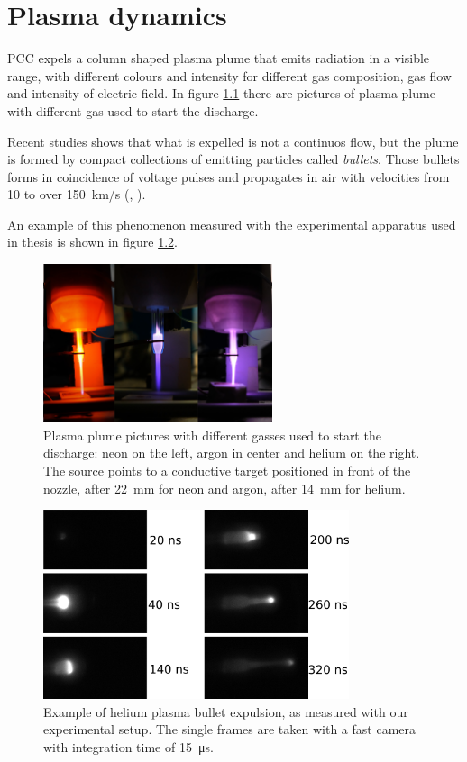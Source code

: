 \chapter{Plasma dynamics}
\label{ch:shape}
PCC expels a column shaped plasma plume that emits radiation in a visible range, with different colours and intensity for different gas composition, gas flow and intensity of electric field. In figure \ref{fig:pl_picture} there are pictures of plasma plume with different gas used to start the discharge.

Recent studies shows that what is expelled is not a continuos flow, but the plume is formed by compact collections of emitting particles called \emph{bullets}. Those bullets forms in coincidence of voltage pulses and propagates in air with velocities from \num{10} to over \SI{150}{\kilo\meter/\second} (\cite{Mericam_Bourdet_2009}, \cite{doi:10.1002/ppap.200900078}).

An example of this phenomenon measured with the experimental apparatus used in thesis is shown in figure \ref{fig:pl_bullet}.
\begin{figure}
 \centering
 \includegraphics[width = 0.6\textwidth]{Images/Shape/plasmapic.png}
 \caption{Plasma plume pictures with different gasses used to start the discharge: neon on the left, argon in center and helium on the right. The source points to a conductive target positioned in front of the nozzle, after \SI{22}{\milli\meter} for neon and argon, after \SI{14}{\milli\meter} for helium.}
 \label{fig:pl_picture}
\end{figure}
\begin{figure}
 \centering
 \includegraphics[width=0.8\textwidth]{Images/Shape/frames.png}
 \caption{Example of helium plasma bullet expulsion, as measured with our experimental setup. The single frames are taken with a fast camera with integration time of \SI{15}{\micro\second}.}
 \label{fig:pl_bullet}
\end{figure}

